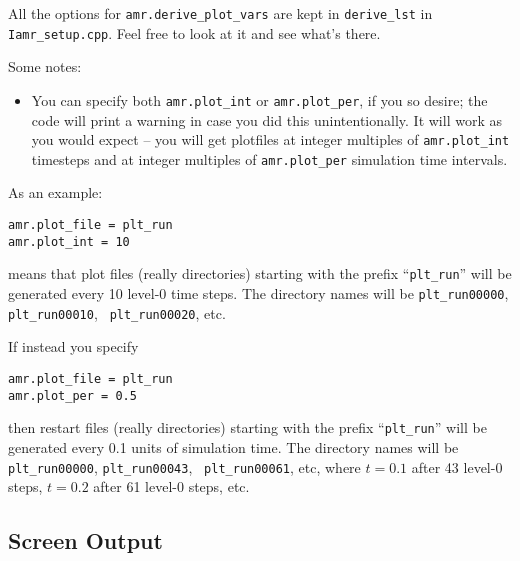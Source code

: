 All the options for {\tt amr.derive\_plot\_vars} are kept in
\texttt{derive\_lst} in {\tt Iamr\_setup.cpp}.  Feel free to look at
it and see what's there.

Some notes:
\begin{itemize}

\item You can specify both {\tt amr.plot\_int} or {\tt amr.plot\_per},
  if you so desire; the code will print a warning in case you did this
  unintentionally. It will work as you would expect -- you will get plotfiles
  at integer multiples of {\tt amr.plot\_int} timesteps and at integer
  multiples of {\tt amr.plot\_per} simulation time intervals.

\end{itemize}


As an example:
\begin{lstlisting}
amr.plot_file = plt_run
amr.plot_int = 10
\end{lstlisting}
means that plot files (really directories) starting with the prefix
``{\tt plt\_run}'' will be generated every 10 level-0 time steps.  The
directory names will be {\tt plt\_run00000}, {\tt plt\_run00010}, {\tt
  plt\_run00020}, etc.


If instead you specify
\begin{lstlisting}
amr.plot_file = plt_run
amr.plot_per = 0.5
\end{lstlisting}
then restart files (really directories) starting with the prefix
``{\tt plt\_run}'' will be generated every 0.1 units of simulation time.  The
directory names will be {\tt plt\_run00000}, {\tt plt\_run00043}, {\tt
  plt\_run00061}, etc, where $t = 0.1$ after 43 level-0 steps, $t =
0.2$ after 61 level-0 steps, etc.



\subsection{Screen Output}

